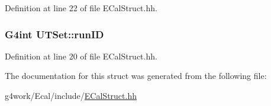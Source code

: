 Definition at line 22 of file E\-Cal\-Struct.\-hh.

\hypertarget{struct_u_t_set_a905fcde57b26fac021d97a9db039edff}{
\subsubsection[{run\-I\-D}]{\setlength{\rightskip}{0pt plus 5cm}G4int U\-T\-Set\-::run\-I\-D}}\label{struct_u_t_set_a905fcde57b26fac021d97a9db039edff}


Definition at line 20 of file E\-Cal\-Struct.\-hh.



The documentation for this struct was generated from the following file\-:\begin{DoxyCompactItemize}
\item 
g4work/\-Ecal/include/\hyperlink{_e_cal_struct_8hh}{E\-Cal\-Struct.\-hh}\end{DoxyCompactItemize}
